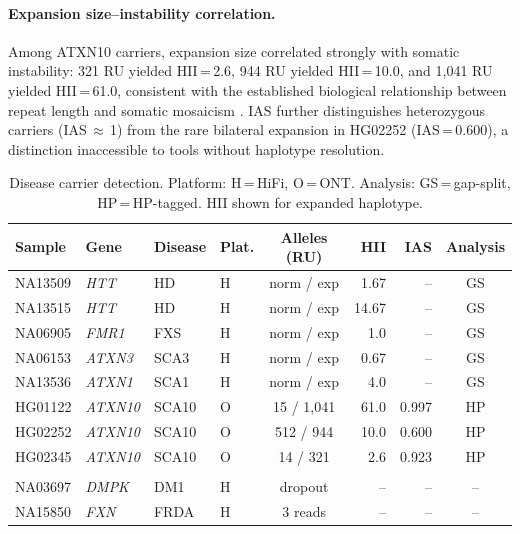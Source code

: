 \documentclass[12pt]{article}
\begin{document}
\paragraph{Expansion size--instability correlation.}
Among ATXN10 carriers, expansion size correlated strongly with somatic instability: 321 RU yielded HII\,=\,2.6, 944 RU yielded HII\,=\,10.0, and 1{,}041 RU yielded HII\,=\,61.0, consistent with the established biological relationship between repeat length and somatic mosaicism \citep{kennedy2003}.
IAS further distinguishes heterozygous carriers (IAS\,$\approx$\,1) from the rare bilateral expansion in HG02252 (IAS\,=\,0.600), a distinction inaccessible to tools without haplotype resolution.

\begin{table}[t]
\centering
\caption{Disease carrier detection.
Platform: H\,=\,HiFi, O\,=\,ONT.
Analysis: GS\,=\,gap-split, HP\,=\,HP-tagged.
HII shown for expanded haplotype.}
\label{tab:carriers}
\small
\begin{tabular}{llllcrrc}
\toprule
Sample & Gene & Disease & Plat. & Alleles (RU) & HII & IAS & Analysis \\
\midrule
NA13509 & \textit{HTT}    & HD    & H & norm / exp   & 1.67  & --    & GS \\
NA13515 & \textit{HTT}    & HD    & H & norm / exp   & 14.67 & --    & GS \\
NA06905 & \textit{FMR1}   & FXS   & H & norm / exp   & 1.0   & --    & GS \\
NA06153 & \textit{ATXN3}  & SCA3  & H & norm / exp   & 0.67  & --    & GS \\
NA13536 & \textit{ATXN1}  & SCA1  & H & norm / exp   & 4.0   & --    & GS \\
HG01122 & \textit{ATXN10} & SCA10 & O & 15 / 1{,}041 & 61.0  & 0.997 & HP \\
HG02252 & \textit{ATXN10} & SCA10 & O & 512 / 944    & 10.0  & 0.600 & HP \\
HG02345 & \textit{ATXN10} & SCA10 & O & 14 / 321     & 2.6   & 0.923 & HP \\
\addlinespace
\multicolumn{8}{l}{\textit{Not detected:}} \\
NA03697 & \textit{DMPK}   & DM1   & H & dropout      & --    & --    & -- \\
NA15850 & \textit{FXN}    & FRDA  & H & 3 reads      & --    & --    & -- \\
\bottomrule
\end{tabular}
\end{table}
\end{document}
